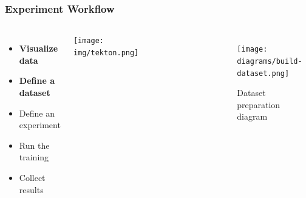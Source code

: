 \documentclass[aspectratio=169,11pt,hyperref={colorlinks=true}]{beamer}
\begin{document}
\begin{frame}
    \frametitle{Experiment Workflow}
    \begin{columns}
        \begin{itemize}
            \item{\textbf{Visualize data}}
            \item{\textbf{Define a dataset}}
            \item{Define an experiment}
            \item{Run the training}
            \item{Collect results}
        \end{itemize}
        \vspace{0.1\paperheight}
        \begin{center}
          \texttt{[image: img/tekton.png]}
        \end{center}
          \begin{figure}
            
          \end{figure}
          \begin{figure}
            \texttt{[image: diagrams/build-dataset.png]}
            \caption{Dataset preparation diagram}
          \end{figure}
    \end{columns}
\end{frame}
\end{document}

